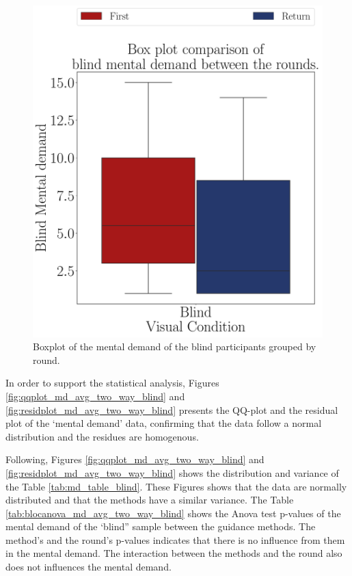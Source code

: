 \begin{figure}[!htb]
\begin{minipage}{0.45\textwidth}
        \includegraphics[width = 0.8\linewidth]{Resultados/Nasa/Figuras/pdf/boxplot_md_blind_rounds.pdf}
        \caption{Boxplot of the mental demand of the blind participants grouped by round.}
        \label{fig:boxplot_md_blind_rounds}
    \end{minipage}
\end{figure}

In order to support the statistical analysis, Figures \ref{fig:qqplot_md_avg_two_way_blind} and \ref{fig:residplot_md_avg_two_way_blind} presents the QQ-plot and the residual plot of the ‘mental demand’ data, confirming that the data follow a normal distribution and the residues are homogenous.

Following, Figures \ref{fig:qqplot_md_avg_two_way_blind} and \ref{fig:residplot_md_avg_two_way_blind} shows the distribution and variance of the Table \ref{tab:md_table_blind}. These Figures shows that the data are normally distributed and that the methods have a similar variance. The Table \ref{tab:blocanova_md_avg_two_way_blind} shows the Anova test p-values of the mental demand of the ‘blind” sample between the guidance methods. The method’s and the round’s p-values indicates that there is no influence from them in the mental demand. The interaction between the methods and the round also does not influences the mental demand.

